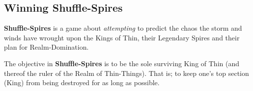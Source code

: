 
\subsection{Winning \textbf{Shuffle-Spires}}
\label{sec:winningshufflespires}
\textbf{Shuffle-Spires} is a game about \textit{attempting} to predict the chaos the storm and winds have wrought upon the Kings of Thin, their Legendary Spires and their plan for Realm-Domination.

The objective in \textbf{Shuffle-Spires} is to be the sole surviving King of Thin (and thereof the ruler of the Realm of Thin-Things).
That is; to keep one’s top section (King) from being destroyed for as long as possible.
